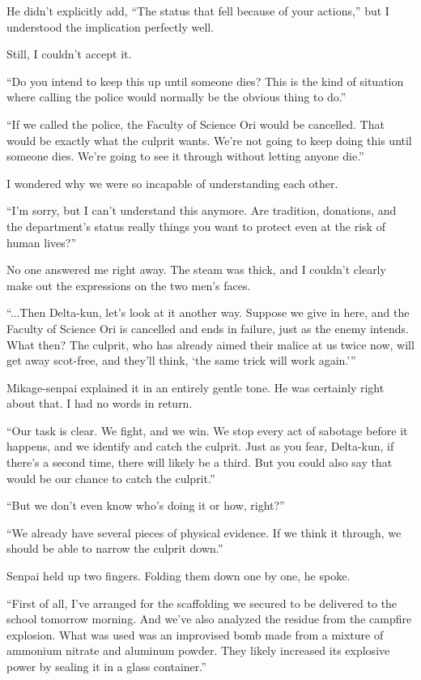 \documentclass[
    a4paper,
    12pt,
    twoside,
    openany,
    UTF8,
    fontset=windows
]{ctexbook}
\begin{document}
He didn't explicitly add, ``The status that fell because of your actions,'' but I understood the implication perfectly well.

Still, I couldn't accept it.

``Do you intend to keep this up until someone dies? This is the kind of situation where calling the police would normally be the obvious thing to do.''

``If we called the police, the Faculty of Science Ori would be cancelled. That would be exactly what the culprit wants. We're not going to keep doing this until someone dies. We're going to see it through without letting anyone die.''

I wondered why we were so incapable of understanding each other.

``I'm sorry, but I can't understand this anymore. Are tradition, donations, and the department's status really things you want to protect even at the risk of human lives?''

No one answered me right away. The steam was thick, and I couldn't clearly make out the expressions on the two men's faces.

``...Then Delta-kun, let's look at it another way. Suppose we give in here, and the Faculty of Science Ori is cancelled and ends in failure, just as the enemy intends. What then? The culprit, who has already aimed their malice at us twice now, will get away scot-free, and they'll think, `the same trick will work again.'''

Mikage-senpai explained it in an entirely gentle tone. He was certainly right about that. I had no words in return.

``Our task is clear. We fight, and we win. We stop every act of sabotage before it happens, and we identify and catch the culprit. Just as you fear, Delta-kun, if there's a second time, there will likely be a third. But you could also say that would be our chance to catch the culprit.''

``But we don't even know who's doing it or how, right?''

``We already have several pieces of physical evidence. If we think it through, we should be able to narrow the culprit down.''

Senpai held up two fingers. Folding them down one by one, he spoke.

``First of all, I've arranged for the scaffolding we secured to be delivered to the school tomorrow morning. And we've also analyzed the residue from the campfire explosion. What was used was an improvised bomb made from a mixture of ammonium nitrate and aluminum powder. They likely increased its explosive power by sealing it in a glass container.''
\end{document}
